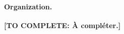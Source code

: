 \documentclass[11pt]{article}
\newcommand{\TODO}[1]{\textbf{[TO COMPLETE: #1]}}
\theoremstyle{plain}
\theoremstyle{definition}
\theoremstyle{remark}
\begin{document}
\paragraph{Organization.}
\TODO{À compléter.}
%
%
\end{document}
